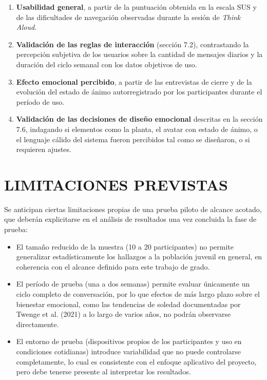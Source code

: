 \begin{enumerate}
    \item \textbf{Usabilidad general}, a partir de la puntuación obtenida en la escala SUS y de las dificultades de navegación observadas durante la sesión de \textit{Think Aloud}.
    \item \textbf{Validación de las reglas de interacción} (sección 7.2), contrastando la percepción subjetiva de los usuarios sobre la cantidad de mensajes diarios y la duración del ciclo semanal con los datos objetivos de uso.
    \item \textbf{Efecto emocional percibido}, a partir de las entrevistas de cierre y de la evolución del estado de ánimo autorregistrado por los participantes durante el período de uso.
    \item \textbf{Validación de las decisiones de diseño emocional} descritas en la sección 7.6, indagando si elementos como la planta, el avatar con estado de ánimo, o el lenguaje cálido del sistema fueron percibidos tal como se diseñaron, o si requieren ajustes.
\end{enumerate}

\section{LIMITACIONES PREVISTAS}
Se anticipan ciertas limitaciones propias de una prueba piloto de alcance acotado, que deberán explicitarse en el análisis de resultados una vez concluida la fase de prueba:

\begin{itemize}
    \item El tamaño reducido de la muestra (10 a 20 participantes) no permite generalizar estadísticamente los hallazgos a la población juvenil en general, en coherencia con el alcance definido para este trabajo de grado.
    \item El período de prueba (una a dos semanas) permite evaluar únicamente un ciclo completo de conversación, por lo que efectos de más largo plazo sobre el bienestar emocional, como las tendencias de soledad documentadas por Twenge et al. (2021) a lo largo de varios años, no podrán observarse directamente.
    \item El entorno de prueba (dispositivos propios de los participantes y uso en condiciones cotidianas) introduce variabilidad que no puede controlarse completamente, lo cual es consistente con el enfoque aplicativo del proyecto, pero debe tenerse presente al interpretar los resultados.
\end{itemize}


